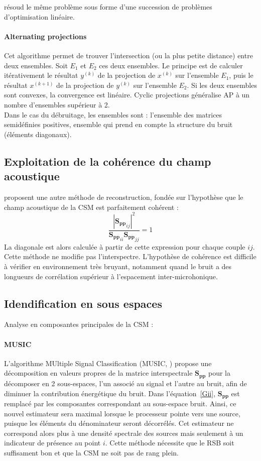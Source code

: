 \cite{dougherty2016} résoud le même problème sous forme d'une succession de problèmes d'optimisation linéaire.


\paragraph{\tbullet Alternating projections}
Cet algorithme permet de trouver l'intersection  (ou la plus petite distance) entre deux ensembles. Soit $E_1$ et $E_2$ ces deux ensembles. Le principe est de calculer itérativement le résultat $y^{(k)}$ de la projection de $x^{(k)}$ sur l'ensemble $E_1$, puis le résultat $x^{(k+1)}$ de la projection de $y^{(k)}$ sur l'ensemble $E_2$. Si les deux ensembles sont convexes, la convergence est linéaire.
Cyclic projections généralise AP à un nombre d'ensembles supérieur à 2.\\
Dans le cas du débruitage, les ensembles sont : l'ensemble des matrices semidéfinies positives, ensemble qui prend en compte la structure du bruit (éléments diagonaux).

\subsection{Exploitation de la cohérence du champ acoustique}
\cite{finez:hal-01276687} proposent une autre méthode de reconstruction, fondée sur l'hypothèse que le champ acoustique de la CSM est parfaitement cohérent : 
\begin{equation}
\frac{|{\bm{S_{pp}}}_{ij}|^2}{{\bm{S_{pp}}}_{ii}{\bm{S_{pp}}}_{jj}} =1
\end{equation}
La diagonale est alors calculée à partir de cette expression pour chaque couple $ij$. Cette méthode ne modifie pas l'interspectre. L'hypothèse de cohérence est difficile à vérifier en environnement très bruyant, notamment quand le bruit a des longueurs de corrélation supérieur à l'espacement inter-microhonique.\\


\subsection{Idendification en sous espaces}
Analyse en composantes principales de la CSM : 
\paragraph{\tbullet MUSIC} L'algorithme MUltiple Signal Classification (MUSIC, \cite{Schmidt1986}) propose une décomposition en valeurs propres de la matrice interspectrale $\bm{S_{pp}}$ pour la décomposer en 2 sous-espaces, l’un associé au signal et l’autre au bruit, afin de diminuer la contribution énergétique du bruit.  Dans l'équation~\ref{Gii}, $\bm{S_{pp}}$ est remplacé par les composantes correspondant au sous-espace bruit. Ainsi, ce nouvel estimateur sera maximal lorsque le processeur pointe vers une source, puisque les éléments du dénominateur seront décorrélés. Cet estimateur ne correspond alors plus à une densité spectrale des sources mais seulement à un indicateur de présence au point $i$. Cette méthode nécessite que le RSB soit suffisament bon et que la CSM ne soit pas de rang plein.\\


